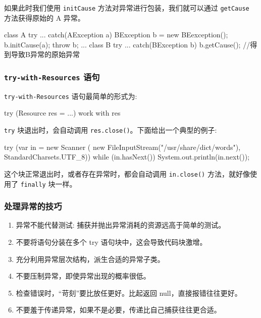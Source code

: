 如果此时我们使用 \texttt{initCause} 方法对异常进行包装，我们就可以通过 \texttt{getCause} 方法获得原始的 A 异常。

\begin{Java}
class A {
    try {
        ...
    } catch(AException a) {
        BException b = new BEexception();
        b.initCause(a);
        throw b;
    }
}
...
class B {
    try {
        ...
    } catch(BException b) {
        b.getCause(); //得到导致B异常的原始异常
    }
}
\end{Java}

\subsubsection{\texttt{try-with-Resources} 语句}

\texttt{try-with-Resources} 语句最简单的形式为:

\begin{Java}
try (Resource res = ...) {
    work with res
}
\end{Java}

\texttt{try} 块退出时，会自动调用 \texttt{res.close()}。下面给出一个典型的例子:

\begin{Java}
try (var in = new Scanner (
    new FileInputStream("/usr/share/dict/words"), StandardCharsets.UTF_8))
{
    while (in.hasNext())
        System.out.println(in.next());
}
\end{Java}

这个块正常退出时，或者存在异常时，都会自动调用 \texttt{in.close()} 方法，就好像使用了 \texttt{finally} 块一样。

\subsubsection{处理异常的技巧}

\begin{enumerate}
    \item 异常不能代替测试: 捕获并抛出异常消耗的资源远高于简单的测试。
    \item 不要将语句分装在多个 try 语句块中，这会导致代码块激增。
    \item 充分利用异常层次结构，派生合适的异常子类。
    \item 不要压制异常，即使异常出现的概率很低。
    \item 检查错误时，``苛刻''要比放任更好。比起返回 null，直接报错往往更好。
    \item 不要羞于传递异常，如果不是必要，传递比自己捕获往往更合适。
\end{enumerate}

